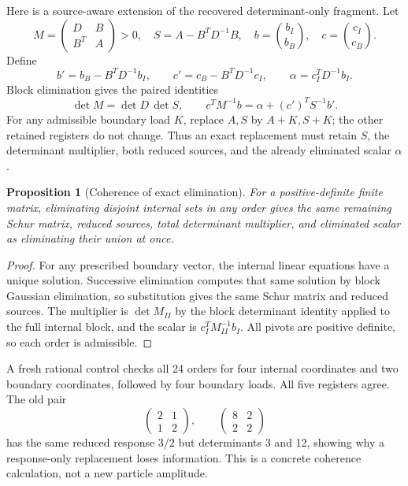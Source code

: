 \documentclass[11pt,letterpaper]{article}
\newtheorem{proposition}[theorem]{Proposition}
\theoremstyle{definition}
\theoremstyle{remark}\newtheorem{remark}[theorem]{Remark}
\begin{document}
Here is a source-aware extension of the recovered determinant-only fragment. Let
\[
M=\begin{pmatrix}D&B\\B^T&A\end{pmatrix}>0,
\quad S=A-B^TD^{-1}B,
\quad b=\binom{b_I}{b_B},\quad c=\binom{c_I}{c_B}.
\]
Define
\[
b'=b_B-B^TD^{-1}b_I,\qquad
c'=c_B-B^TD^{-1}c_I,\qquad
\alpha=c_I^TD^{-1}b_I.
\]
Block elimination gives the paired identities
\begin{equation}\label{eq:sourceschur}
\det M=\det D\,\det S,\qquad
c^TM^{-1}b=\alpha+(c')^TS^{-1}b'.
\end{equation}
For any admissible boundary load $K$, replace $A,S$ by $A+K,S+K$; the other retained registers do not change. Thus an exact replacement must retain $S$, the determinant multiplier, both reduced sources, and the already eliminated scalar $\alpha$.

\begin{proposition}[Coherence of exact elimination]\label{prop:coherentschur}
For a positive-definite finite matrix, eliminating disjoint internal sets in any order gives the same remaining Schur matrix, reduced sources, total determinant multiplier, and eliminated scalar as eliminating their union at once.
\end{proposition}
\begin{proof}
For any prescribed boundary vector, the internal linear equations have a unique solution. Successive elimination computes that same solution by block Gaussian elimination, so substitution gives the same Schur matrix and reduced sources. The multiplier is $\det M_{II}$ by the block determinant identity applied to the full internal block, and the scalar is $c_I^TM_{II}^{-1}b_I$. All pivots are positive definite, so each order is admissible.
\end{proof}
A fresh rational control checks all 24 orders for four internal coordinates and two boundary coordinates, followed by four boundary loads. All five registers agree. The old pair
\[
\begin{pmatrix}2&1\\1&2\end{pmatrix},\qquad
\begin{pmatrix}8&2\\2&2\end{pmatrix}
\]
has the same reduced response $3/2$ but determinants 3 and 12, showing why a response-only replacement loses information. This is a concrete coherence calculation, not a new particle amplitude.
\end{document}
